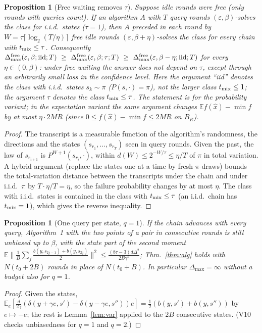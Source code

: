 \documentclass[11pt,a4paper]{article}
\numberwithin{equation}{section}
\newtheorem{proposition}[theorem]{Proposition}
\theoremstyle{definition}
\theoremstyle{remark}
\newcommand{\E}{\mathbb E}\newcommand{\R}{\mathbb R}\newcommand{\N}{\mathbb N}\newcommand{\Prob}{\mathbb P}
\newcommand{\norm}[1]{\lVert #1\rVert}\newcommand{\abs}[1]{\lvert #1\rvert}\newcommand{\ip}[2]{\langle #1,#2\rangle}
\newcommand{\Dmax}{\Delta_{\max}}\newcommand{\Dcp}{\Delta_{\rm cp}}
\begin{document}
\begin{proposition}[Free waiting removes $\tau$]\label{prop:wait}
Suppose idle rounds were free (only rounds with queries count). If an algorithm $A$ with $T$ query rounds $(\varepsilon,\beta)$-solves the class for i.i.d.\ states ($\tau=1$), then $A$ preceded in each round by $W=\tau\lceil\log_2(T/\eta)\rceil$ free idle rounds $(\varepsilon,\beta+\eta)$-solves the class for every chain with $t_{\rm mix}\le\tau$. Consequently $\Dmax^{\rm free}(\varepsilon,\beta;{\rm iid};T)\ \ge\ \Dmax^{\rm free}(\varepsilon,\beta;\tau;T)\ \ge\ \Dmax^{\rm free}(\varepsilon,\beta-\eta;{\rm iid};T)$ for every $\eta\in(0,\beta)$: under free waiting the answer does not depend on $\tau$, except through an arbitrarily small loss in the confidence level. Here the argument ``iid'' denotes the class with i.i.d.\ states $s_k\sim\pi$ ($P(s,\cdot)=\pi$), \emph{not} the larger class $t_{\rm mix}\le1$; the argument $\tau$ denotes the class $t_{\rm mix}\le\tau$. The statement is for the probability variant; in the expectation variant the same argument changes $\E f(\hat x)-\min f$ by at most $\eta\cdot2MR$ (since $0\le f(\hat x)-\min f\le2MR$ on $B_R$).
\end{proposition}
\begin{proof}
The transcript is a measurable function of the algorithm's randomness, the directions and the states $(s_{r_1},\dots,s_{r_T})$ seen in query rounds. Given the past, the law of $s_{r_{i+1}}$ is $P^{W+1}(s_{r_i},\cdot)$, within $d(W)\le2^{-W/\tau}\le\eta/T$ of $\pi$ in total variation. A hybrid argument (replace the states one at a time by fresh $\pi$-draws) bounds the total-variation distance between the transcripts under the chain and under i.i.d.\ $\pi$ by $T\cdot\eta/T=\eta$, so the failure probability changes by at most $\eta$. The class with i.i.d.\ states is contained in the class with $t_{\rm mix}\le\tau$ (an i.i.d.\ chain has $t_{\rm mix}=1$), which gives the reverse inequality.
\end{proof}

\begin{proposition}[One query per state, $q=1$]\label{prop:q1}
If the chain advances with every query, Algorithm~1 with the two points of a pair in consecutive rounds is still unbiased up to $\beta$, with the state part of the second moment $\E\norm{\frac1B\sum_j\frac{b(y,s_{2j-1})+b(y,s_{2j})}2}^2\le\frac{(8\tau-3)d\Delta^2}{2B\gamma^2}$; Thm.~\ref{thm:alg} holds with $N(t_0+2B)$ rounds in place of $N(t_0+B)$. In particular $\Dmax=\infty$ without a budget also for $q=1$.
\end{proposition}
\begin{proof}
Given the states, $\E_e[\frac d{2\gamma}(\delta(y+\gamma e,s')-\delta(y-\gamma e,s''))e]=\frac12(b(y,s')+b(y,s''))$ by $e\mapsto-e$; the rest is Lemma~\ref{lem:var} applied to the $2B$ consecutive states. (V10 checks unbiasedness for $q=1$ and $q=2$.)
\end{proof}
\end{document}
